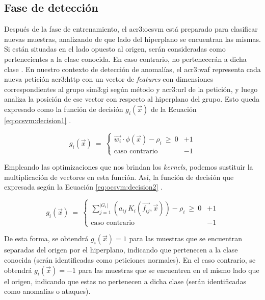 \subsection{Fase de detección}

Después de la fase de entrenamiento, el \gls{acr3:ocsvm}
está preparado para clasificar nuevas muestras, analizando de que lado
del hiperplano se encuentran las mismas. Si están situadas en el lado
opuesto al origen, serán consideradas como pertenecientes a la clase
conocida. En caso contrario, no pertenecerán a dicha clase
\cite{perdisci2006using}. %
En nuestro contexto de detección de anomalías, el \gls{acr3:waf} representa
cada nueva petición \gls{acr3:http} con un vector de \textit{features}
con dimensiones correspondientes al grupo \gls{sim3:gi} según método y
\gls{acr3:url} de la petición, y luego analiza la posición de ese vector
con respecto al hiperplano del grupo.
Esto queda expresado como la función de decisión $g_{i}(\vec{x})$ de
la Ecuación \ref{eq:ocsvm:decision1}
\cite{amer2013paper}. %

\begin{equation}
    \label{eq:ocsvm:decision1}
    g_{i}(\vec{x})
    \ = \
    \begin{cases}
        \vec{w_{i}} \cdot \phi(\vec{x}) - \rho_{i} \ \geqslant \ 0  & +1 \\
        \text{caso contrario}                                       & -1
    \end{cases}
\end{equation}

Empleando las optimizaciones que nos brindan los \textit{kernels}, podemos
sustituir la multiplicación de vectores en esta función. Así, la función
de decisión que expresada según la Ecuación \ref{eq:ocsvm:decision2}
\cite{perdisci2006using}. %

\begin{equation}
    \label{eq:ocsvm:decision2}
    g_{i}(\vec{x})
    \ = \
    \begin{cases}
        \sum_{j=1}^{\lvert G_{i} \rvert}
        \left(
            a_{ij} \, K_{i}(\vec{f_{ij}}, \vec{x})
        \right)
        - \rho_{i} \ \geqslant \ 0  & +1 \\
        \text{caso contrario}       & -1
    \end{cases}
\end{equation}

De esta forma, se obtendrá $g_{i}(\vec{x}) = 1$ para las muestras que
se encuentran separadas del origen por el hiperplano, indicando que
pertenecen a la clase conocida (serán identificadas como peticiones
normales).
En el caso contrario, se obtendrá $g_{i}(\vec{x}) = -1$ para las muestras
que se encuentren en el mismo lado que el origen, indicando que estas
no pertenecen a dicha clase (serán identificadas como anomalías o ataques).


